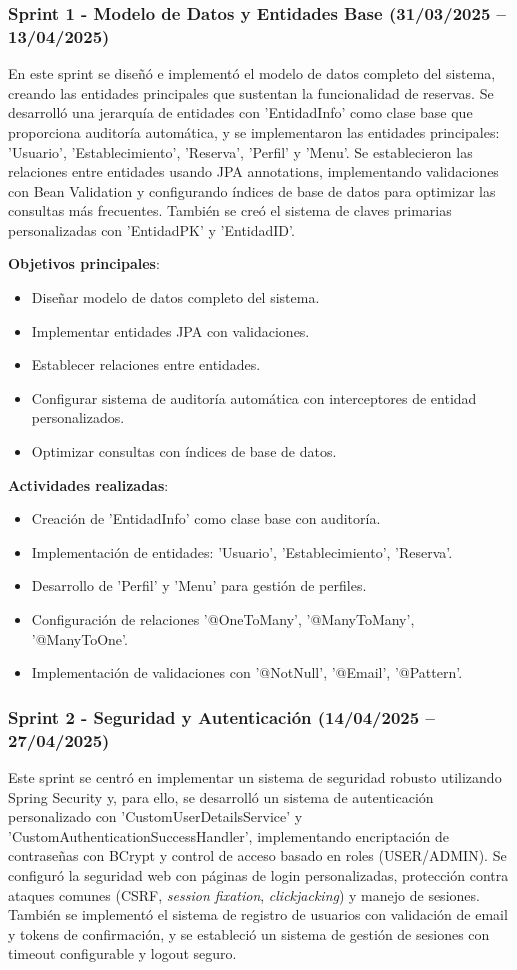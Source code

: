 \subsubsection{Sprint 1 - Modelo de Datos y Entidades Base (31/03/2025 – 13/04/2025)} 
En este sprint se diseñó e implementó el modelo de datos completo del sistema, creando las entidades principales que sustentan la funcionalidad de reservas. Se desarrolló una jerarquía de entidades con 'EntidadInfo' como clase base que proporciona auditoría automática, y se implementaron las entidades principales: 'Usuario', 'Establecimiento', 'Reserva', 'Perfil' y 'Menu'. Se establecieron las relaciones entre entidades usando JPA annotations, implementando validaciones con Bean Validation y configurando índices de base de datos para optimizar las consultas más frecuentes. También se creó el sistema de claves primarias personalizadas con 'EntidadPK' y 'EntidadID'.

\textbf{Objetivos principales}:
\begin{itemize}
\tightlist
\item
Diseñar modelo de datos completo del sistema.
\item
Implementar entidades JPA con validaciones.
\item
Establecer relaciones entre entidades.
\item
Configurar sistema de auditoría automática con interceptores de entidad personalizados.
\item
Optimizar consultas con índices de base de datos.
\end{itemize}

\textbf{Actividades realizadas}:
\begin{itemize}
\tightlist
\item
Creación de 'EntidadInfo' como clase base con auditoría.
\item
Implementación de entidades: 'Usuario', 'Establecimiento', 'Reserva'.
\item
Desarrollo de 'Perfil' y 'Menu' para gestión de perfiles.
\item
Configuración de relaciones '@OneToMany', '@ManyToMany', '@ManyToOne'.
\item
Implementación de validaciones con '@NotNull', '@Email', '@Pattern'.
\end{itemize}

\subsubsection{Sprint 2 - Seguridad y Autenticación (14/04/2025 – 27/04/2025)} 
Este sprint se centró en implementar un sistema de seguridad robusto utilizando Spring Security y, para ello, se desarrolló un sistema de autenticación personalizado con 'CustomUserDetailsService' y 'CustomAuthenticationSuccessHandler', implementando encriptación de contraseñas con BCrypt y control de acceso basado en roles (USER/ADMIN). Se configuró la seguridad web con páginas de login personalizadas, protección contra ataques comunes (CSRF, \emph{session fixation}, \emph{clickjacking}) y manejo de sesiones. También se implementó el sistema de registro de usuarios con validación de email y tokens de confirmación, y se estableció un sistema de gestión de sesiones con timeout configurable y logout seguro.

